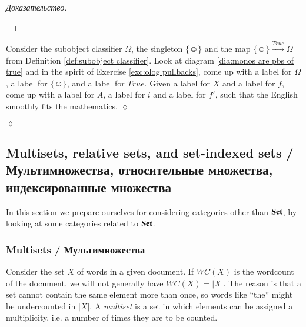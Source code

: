 \documentclass[a4paper]{book}
\def\singleton{\{\smiley\}}
\newcommand{\To}[1]{\xrightarrow{#1}}
\def\Set{{\bf Set}}
\theoremstyle{myth}
\newtheorem{excENG}[envENG]{\begin{english}Exercise\end{english}}
\newenvironment{exerciseENG}{\begin{excENG}}{\hspace*{\fill}$\lozenge$\end{excENG}}
\newtheorem{excRUS}[envRUS]{\begin{russian}Упражнение\end{russian}}
\newenvironment{proofRUS}{\begin{proof}[Доказательство]}{\end{proof}}
\newenvironment{exerciseRUS}{\begin{excRUS}}{\hspace*{\fill}$\lozenge$\end{excRUS}}
\begin{document}
\begin{english}
\begin{proofRUS}
\begin{russian} \end{russian}
\end{proofRUS}

\begin{exerciseENG}
Consider the subobject classifier $\Omega$, the singleton $\singleton$ and the map $\singleton\To{True}\Omega$ from Definition \ref{def:subobject classifier}. Look at diagram \ref{dia:monos are pbs of true} and in the spirit of Exercise \ref{exc:olog pullbacks}, come up with a label for $\Omega$, a label for $\singleton$, and a label for $True$. Given a label for $X$ and a label for $f$, come up with a label for $A$, a label for $i$ and a label for $f'$, such that the English smoothly fits the mathematics.
\end{exerciseENG}

\begin{exerciseRUS}
\begin{russian} \end{russian}
\end{exerciseRUS}


\subsection{Multisets, relative sets, and set-indexed sets / Мультимножества, относительные множества, индексированные множества}

In this section we prepare ourselves for considering categories other than $\Set$, by looking at some categories related to $\Set$. 

\begin{russian} \end{russian}


\subsubsection{Multisets / Мультимножества}

Consider the set $X$ of words in a given document. If $WC(X)$ is the wordcount of the document, we will not generally have $WC(X)=|X|$. The reason is that a set cannot contain the same element more than once, so words like “the” might be undercounted in $|X|$. A {\em multiset} is a set in which elements can be assigned a multiplicity, i.e. a number of times they are to be counted. 


\end{english}
\end{document}
